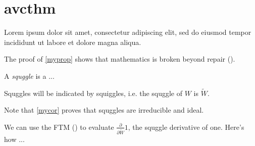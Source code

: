\newpage
\section*{avcthm}\indent

Lorem ipsum dolor sit amet, consectetur adipiscing elit, sed do eiusmod tempor incididunt ut labore et dolore magna aliqua.
\begin{pro}
\label{myprop}
\end{pro}
The proof of \cref{myprop} shows that mathematics is broken beyond repair ().

\begin{dfn}
A \textit{squggle} is a ...
\end{dfn}

\begin{ntt}
Squggles will be indicated by squiggles, i.e. the squggle of $W$ is $\widetilde{W}$.
\end{ntt}

\begin{lem}
\end{lem}

\begin{thm}
\label{mythm}
\end{thm}

\begin{cor}
\label{mycor}
\end{cor}

\begin{rmk}
Note that \cref{mycor} proves that squggles are irreducible and ideal.
\end{rmk}

\begin{ex}
We can use the FTM () to evaluate $\displaystyle\frac{\partial}{\partial \widetilde{W}}1$, the squggle derivative of one.  Here's how ...
\end{ex}


